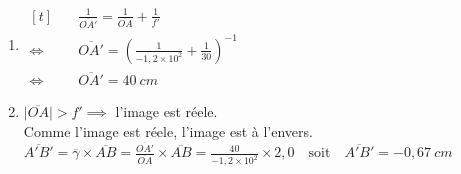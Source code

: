 \documentclass[12pt, a4paper]{article}
\begin{document}
    \begin{Exercise}[number={29}]
        \begin{enumerate}[1.]
            \item	$\begin{aligned}[t]
                        &\quad \frac{1}{\overline{OA'}}=\frac{1}{\overline{OA}}+\frac{1}{f'} &\\
                        \iff&\quad \overline{OA'}=\left(\frac{1}{-1{,}2\times 10^{2}}+\frac{1}{30}\right)^{-1} &\\
                        \iff&\quad \overline{OA'}=40\ \si{cm}
                    \end{aligned}$
            \item   $\lvert\overline{OA}\rvert>f'\implies$ l'image est réele. \\ Comme l'image est réele, l'image est à l'envers. \\ $\overline{A'B'}=\overline{\gamma}\times\overline{AB}=\frac{\overline{OA'}}{\overline{OA}}\times\overline{AB}=\frac{40}{-1{,}2\times 10^2}\times 2{,}0 \quad \text{soit} \quad \overline{A'B'}=-0{,}67\ \si{cm}$
        \end{enumerate}
    \end{Exercise}
\end{document}
